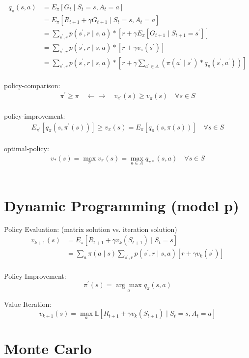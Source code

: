 \documentclass{article}
\begin{document}
\begin{align*}
    q_{\pi}(s, a)
      &= E_{\pi} \left[ G_{t} \mid S_{t}=s, A_{t}=a \right] \\
      &= E_{\pi} \left[ R_{t+1}+\gamma G_{t+1} 
         \mid S_{t}=s, A_{t}=a \right] \\
      &= \sum_{s^{\prime}, r} 
         p \left( s^{\prime}, r \mid s, a \right) * 
         \left[ r + \gamma 
         E_{\pi} \left[ G_{t+1} \mid S_{t+1}=s^{\prime} \right] \right] \\
      &= \sum_{s^{\prime}, r} 
         p \left( s^{\prime}, r \mid s, a \right) * 
         \left[ r + \gamma 
         v_{\pi} \left( s^{\prime} \right) \right] \\
      &= \sum_{s^{\prime}, r} 
         p \left( s^{\prime}, r \mid s, a \right) * 
         \left[ r + \gamma 
         \sum_{a^{\prime} \in A} 
         \left( \pi \left( a^{\prime} \mid s^{\prime} \right) * 
         q_{\pi} \left( s^{\prime}, a^{\prime} \right) \right) \right] \\
\end{align*}


policy-comparison: \
\begin{align*}
    \pi^{\prime} \geq \pi 
    \quad \leftarrow \rightarrow \quad 
    v_{\pi^{\prime}}(s) \geq v_{\pi}(s) 
    \quad \forall s \in S
\end{align*}
\\

policy-improvement: \
\begin{align*}
    E_{\pi^{\prime}} 
    \left[ q_{\pi} \left( s, \pi^{\prime}(s) \right) \right] 
    \geq v_{\pi}(s) 
    = E_{\pi} \left[ q_{\pi} \left( s, \pi(s) \right) \right] 
    \quad \forall s \in S
\end{align*}
\\

optimal-policy: \
\begin{align*}
    v_{*}(s) = \max_{\pi} v_{\pi}(s)
    = \max_{a \in A} q_{\pi *}(s, a) 
    \quad \forall s \in S
\end{align*}
\\


\newpage
\section{Dynamic Programming (model p)}


Policy Evaluation: (matrix solution vs. iteration solution) \
\begin{align*}
    v_{k+1}(s) 
    &= {E}_{\pi} \left[ R_{t+1}+\gamma 
    v_{k} \left( S_{t+1} \right) \mid S_{t}=s \right] \\
    &= \sum_{a} \pi(a \mid s) \sum_{s^{\prime}, r} 
    p \left( s^{\prime}, r \mid s, a \right) 
    \left[ r+\gamma v_{k} \left( s^{\prime} \right) \right]
\end{align*}
\\


Policy Improvement:
$$\pi^{\prime}(s)=\underset{a}{\arg \max} q_{\pi}(s, a)$$

Value Iteration:
$$v_{k+1}(s)=\max_{a} \mathbb{E} \left[R_{t+1}+\gamma v_{k}\left(S_{t+1}\right) \mid S_{t}=s, A_{t}=a\right]$$

\section{Monte Carlo}
\end{document}

